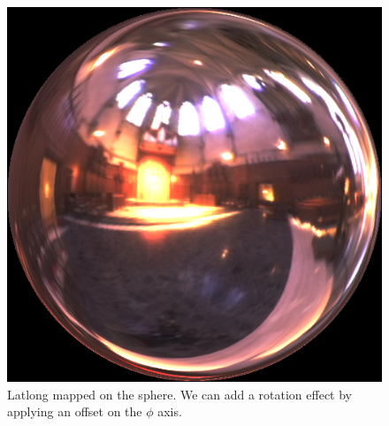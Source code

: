 \documentclass[a4paper,12pt,oneside,final]{report}
\begin{document}
\begin{figure}[!h]
\centering
\includegraphics[scale=0.9]{pictures/final_rotate3.png}
\caption{Latlong mapped on the sphere. We can add a rotation effect by applying an offset on the $\phi$ axis.}
\end{figure}



\end{document}
